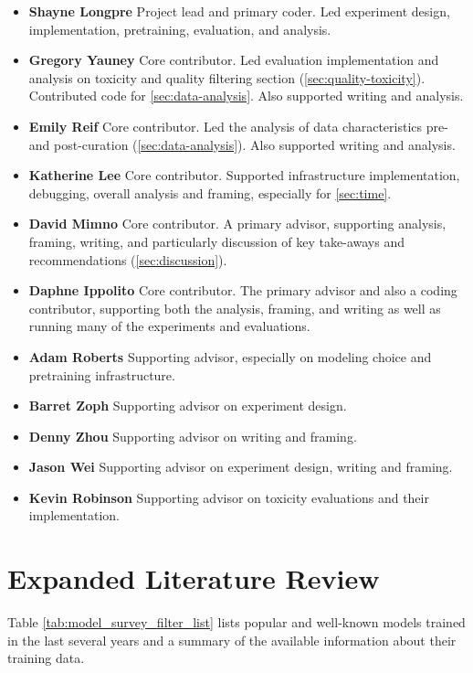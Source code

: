 \documentclass{article}
\begin{document}
\begin{itemize}
    \item \textbf{Shayne Longpre} \; Project lead and primary coder. Led experiment design, implementation, pretraining, evaluation, and analysis.
    \item \textbf{Gregory Yauney} \; Core contributor. Led evaluation implementation and analysis on toxicity and quality filtering section (\cref{sec:quality-toxicity}). Contributed code for \cref{sec:data-analysis}. Also supported writing and analysis.
    \item \textbf{Emily Reif} \; Core contributor. Led the analysis of data characteristics pre- and post-curation (\cref{sec:data-analysis}). Also supported writing and analysis.
    \item \textbf{Katherine Lee} \; Core contributor. Supported infrastructure implementation, debugging, overall analysis and framing, especially for \cref{sec:time}.
    \item \textbf{David Mimno} \; Core contributor. A primary advisor, supporting analysis, framing, writing, and particularly discussion of key take-aways and recommendations (\cref{sec:discussion}).
    \item \textbf{Daphne Ippolito} \; Core contributor. The primary advisor and also a coding contributor, supporting both the analysis, framing, and writing as well as running many of the experiments and evaluations.
    \item \textbf{Adam Roberts} \; Supporting advisor, especially on modeling choice and pretraining infrastructure.
    \item \textbf{Barret Zoph} \; Supporting advisor on experiment design.
    \item \textbf{Denny Zhou}\; Supporting advisor on writing and framing.
    \item \textbf{Jason Wei} \; Supporting advisor on experiment design, writing and framing.
    \item \textbf{Kevin Robinson} \; Supporting advisor on toxicity evaluations and their implementation.
\end{itemize}

\vspace{-3mm}
\section{Expanded Literature Review}

Table \ref{tab:model_survey_filter_list} lists popular and well-known models trained in the last several years and a summary of the available information about their training data.
\end{document}
